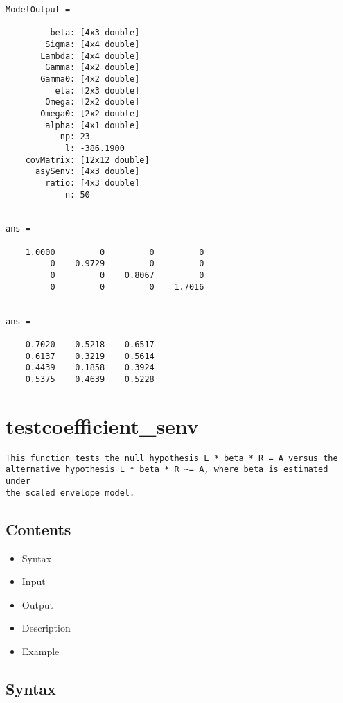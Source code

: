 \documentclass[a4paper,11pt,openany]{memoir}
\begin{document}
        \color{lightgray}\ttfamily \begin{verbatim}
ModelOutput = 

         beta: [4x3 double]
        Sigma: [4x4 double]
       Lambda: [4x4 double]
        Gamma: [4x2 double]
       Gamma0: [4x2 double]
          eta: [2x3 double]
        Omega: [2x2 double]
       Omega0: [2x2 double]
        alpha: [4x1 double]
           np: 23
            l: -386.1900
    covMatrix: [12x12 double]
      asySenv: [4x3 double]
        ratio: [4x3 double]
            n: 50


ans =

    1.0000         0         0         0
         0    0.9729         0         0
         0         0    0.8067         0
         0         0         0    1.7016


ans =

    0.7020    0.5218    0.6517
    0.6137    0.3219    0.5614
    0.4439    0.1858    0.3924
    0.5375    0.4639    0.5228

\end{verbatim} \rmfamily
\color{black}
\newpage

\rmfamily
\color{black}\section{testcoefficient\_senv}


\begin{verbatim}This function tests the null hypothesis L * beta * R = A versus the
alternative hypothesis L * beta * R ~= A, where beta is estimated under
the scaled envelope model.\end{verbatim}
    
\subsection*{Contents}

\begin{itemize}
\setlength{\itemsep}{-1ex}
   \item Syntax
   \item Input
   \item Output
   \item Description
   \item Example
\end{itemize}


\subsection*{Syntax}
\end{document}
